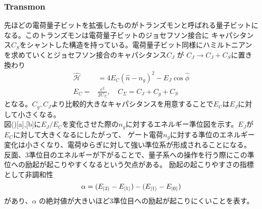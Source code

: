         \subsubsection{Transmon}
        先ほどの電荷量子ビットを拡張したものがトランズモンと呼ばれる量子ビットになる。このトランズモンは電荷量子ビットのジョセフソン接合に
        キャパシタンス$C_S$をシャントした構造を持っている。電荷量子ビット同様にハミルトニアンを求めていくとジョセフソン接合のキャパシタンス$C_J$ が
        $C_J \to C_J + C_S$に置き換わり
        \begin{equation}
            \begin{aligned}
            \hat{\mathcal{H}} &=4 E_{C}\left(\hat{n}-n_{g}\right)^{2}-E_{J} \cos \hat{\phi} \\
            E_{C}=& \frac{e^{2}}{2 C_{\Sigma}}, \quad C_{\Sigma}=C_{J}+C_{g}+C_{S}
            \end{aligned}
        \end{equation}
        となる。$C_g,C_J$より比較的大きなキャパシタンスを用意することで$E_C$は$E_J$に対して小さくなる。\\
        図()[a],[b]に$E_J/E_C$を変化させた際の$n_g$に対するエネルギー準位図を示す。$E_J$が$E_C$に対して大きくなるにしたがって、
        ゲート電荷$n_g$に対する準位のエネルギー変化は小さくなり、電荷ゆらぎに対して強い準位系が形成されることになる。
        反面、3準位目のエネルギーが下がることで、量子系への操作を行う際にこの準位への励起が起こりやすくなるという欠点がある。
        励起の起こりやすさの指標として非調和性
        \begin{equation}
            \alpha = (E_{\ket{2}}-E_{\ket{1}})-(E_{\ket{1}}-E_{\ket{0}})
        \end{equation}
        があり、$\alpha$ の絶対値が大きいほど3準位目への励起が起こりにくいことを表す。
